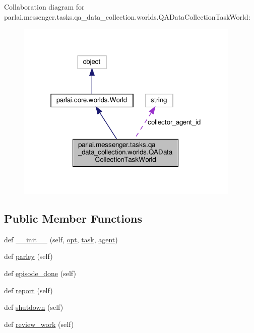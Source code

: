 Collaboration diagram for parlai.\+messenger.\+tasks.\+qa\+\_\+data\+\_\+collection.\+worlds.\+Q\+A\+Data\+Collection\+Task\+World\+:
\nopagebreak
\begin{figure}[H]
\begin{center}
\leavevmode
\includegraphics[width=303pt]{classparlai_1_1messenger_1_1tasks_1_1qa__data__collection_1_1worlds_1_1QADataCollectionTaskWorld__coll__graph}
\end{center}
\end{figure}
\subsection*{Public Member Functions}
\begin{DoxyCompactItemize}
\item 
def \hyperlink{classparlai_1_1messenger_1_1tasks_1_1qa__data__collection_1_1worlds_1_1QADataCollectionTaskWorld_a83f5c2c5baa659af1426922438190f99}{\+\_\+\+\_\+init\+\_\+\+\_\+} (self, \hyperlink{classparlai_1_1core_1_1worlds_1_1World_a3640d92718acd3e6942a28c1ab3678bd}{opt}, \hyperlink{classparlai_1_1messenger_1_1tasks_1_1qa__data__collection_1_1worlds_1_1QADataCollectionTaskWorld_a67869aa6d9b089a564def261cbd9b3e1}{task}, \hyperlink{classparlai_1_1messenger_1_1tasks_1_1qa__data__collection_1_1worlds_1_1QADataCollectionTaskWorld_a5552d7b22f7a5c07aa7f4485f7a02bc7}{agent})
\item 
def \hyperlink{classparlai_1_1messenger_1_1tasks_1_1qa__data__collection_1_1worlds_1_1QADataCollectionTaskWorld_ab93f22d24834dc304c101bdf67944189}{parley} (self)
\item 
def \hyperlink{classparlai_1_1messenger_1_1tasks_1_1qa__data__collection_1_1worlds_1_1QADataCollectionTaskWorld_a52daa8b3d8a0d5616956ea6b2ccd582e}{episode\+\_\+done} (self)
\item 
def \hyperlink{classparlai_1_1messenger_1_1tasks_1_1qa__data__collection_1_1worlds_1_1QADataCollectionTaskWorld_a110ef314ad6a74ef36afb9377066f55d}{report} (self)
\item 
def \hyperlink{classparlai_1_1messenger_1_1tasks_1_1qa__data__collection_1_1worlds_1_1QADataCollectionTaskWorld_a53d38d56e626f2c24d173f26ad644353}{shutdown} (self)
\item 
def \hyperlink{classparlai_1_1messenger_1_1tasks_1_1qa__data__collection_1_1worlds_1_1QADataCollectionTaskWorld_ab474c211d71d86b8b14d19c1e009759a}{review\+\_\+work} (self)
\end{DoxyCompactItemize}
